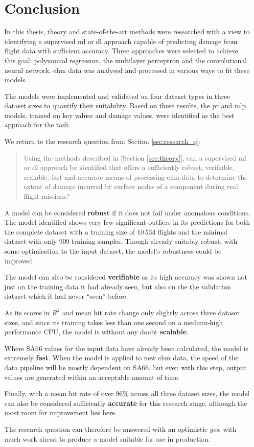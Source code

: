 \chapter{Conclusion} \label{sec:conclusion}
In this thesis, theory and state-of-the-art methods were researched with a view to identifying a supervised \ac{ml} or \ac{dl} approach capable of predicting damage from flight data with sufficient accuracy. Three approaches were selected to achieve this goal: polynomial regression, the multilayer perceptron and the convolutional neural network. \ac{ehm} data was analysed and processed in various ways to fit these models.

The models were implemented and validated on four dataset types in three dataset sizes to quantify their suitability. Based on these results, the \ac{pr} and \ac{mlp} models, trained on key values and damage values, were identified as the best approach for the task.

We return to the research question from Section \ref{sec:research_q}:

\begin{quote}
    Using the methods described in [Section \ref{sec:theory}], can a supervised \ac{ml} or \ac{dl} approach be identified that offers a sufficiently robust, verifiable, scalable, fast and accurate means of processing \ac{ehm} data to determine the extent of damage incurred by surface nodes of a component during real flight missions?
\end{quote}

A model can be considered \textbf{robust} if it does not fail under anomalous conditions. The model identified shows very few significant outliers in its predictions for both the complete dataset with a training size of 10\,534 flights and the minimal dataset with only 909 training samples. Though already suitably robust, with some optimisation to the input dataset, the model's robustness could be improved.

The model can also be considered \textbf{verifiable} as its high accuracy was shown not just on the training data it had already seen, but also on the the validation dataset which it had never ``seen'' before.

As its scores in \(R^2\) and mean hit rate change only slightly across three dataset sizes, and since its training takes less than one second on a medium-high performance CPU, the model is without any doubt \textbf{scalable}.

Where SA66 values for the input data have already been calculated, the model is extremely \textbf{fast}. When the model is applied to new \ac{ehm} data, the speed of the data pipeline will be mostly dependent on SA66, but even with this step, output values are generated within an acceptable amount of time.

Finally, with a mean hit rate of over 96\% across all three dataset sizes, the model can also be considered sufficiently \textbf{accurate} for this research stage, although the most room for improvement lies here.

The research question can therefore be answered with an optimistic \textit{yes}, with much work ahead to produce a model suitable for use in production.
